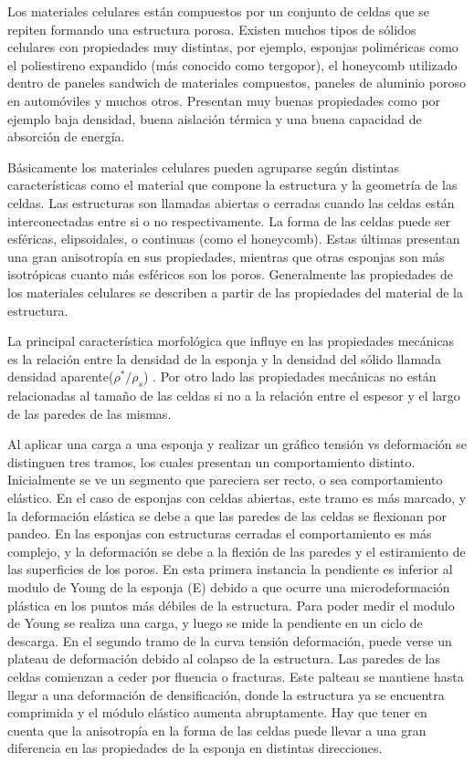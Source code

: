 \documentclass[a4paper,12pt,fleqn,twoside,openany]{book}
\begin{document}
Los materiales celulares están compuestos por un conjunto de celdas que se repiten formando una estructura porosa. Existen muchos tipos de sólidos celulares 
con propiedades muy distintas, por ejemplo, esponjas poliméricas como el poliestireno expandido (más conocido como tergopor), el honeycomb utilizado dentro 
de paneles sandwich de materiales compuestos, paneles de aluminio poroso en automóviles y muchos otros. Presentan muy buenas propiedades como por ejemplo 
baja densidad, buena aislación térmica y una buena capacidad de absorción de energía.

Básicamente los materiales celulares pueden agruparse según distintas características como el material que compone la estructura y la geometría de las 
celdas. Las estructuras son llamadas abiertas o cerradas cuando las celdas están interconectadas entre si o no respectivamente. La forma de las celdas 
puede ser esféricas, elipsoidales, o continuas (como el honeycomb). Estas últimas presentan una gran anisotropía en sus propiedades, mientras que otras 
esponjas son más isotrópicas cuanto más esféricos son los poros. Generalmente las propiedades de los materiales celulares se describen a partir de las 
propiedades del material de la estructura. 

La principal característica morfológica que influye en las propiedades mecánicas es la relación entre la densidad de la esponja y la densidad 
del sólido llamada densidad aparente($\rho^* / \rho_s$) \cite{cellular}. Por otro lado las propiedades mecánicas no están relacionadas al tamaño 
de las celdas si no a la relación entre el espesor y el largo de las paredes de las mismas.  

Al aplicar una carga a una esponja y realizar un gráfico tensión vs deformación se distinguen tres tramos, los cuales presentan un comportamiento 
distinto. Inicialmente se ve un segmento que pareciera ser recto, o sea comportamiento elástico. En el caso de esponjas con celdas abiertas, este tramo 
es más marcado, y la deformación elástica se debe a que las paredes de las celdas se flexionan por pandeo. En las esponjas con estructuras cerradas el 
comportamiento es más complejo, y la deformación se debe a la flexión de las paredes y el estiramiento de las superficies de los poros. En esta primera 
instancia la pendiente es inferior al modulo de Young de la esponja (E) debido a que ocurre una microdeformación plástica en los puntos más débiles de la 
estructura. Para poder medir el modulo de Young se realiza una carga, y luego se mide la pendiente en un ciclo de descarga.
En el segundo tramo de la curva tensión deformación, puede verse un plateau de deformación debido al colapso de la estructura. Las paredes de las celdas 
comienzan a ceder por fluencia o fracturas. Este palteau se mantiene hasta llegar a una deformación de densificación, donde la estructura ya se encuentra 
comprimida y el módulo elástico aumenta abruptamente. Hay que tener en cuenta que la anisotropía en la forma de las celdas puede llevar a una gran diferencia 
en las propiedades de la esponja en distintas direcciones.
\end{document}
